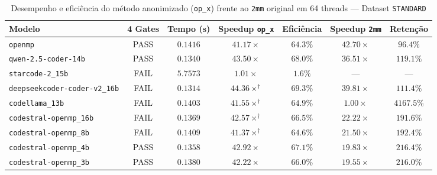 \begin{table}[htbp]
\centering
\caption{Desempenho e eficiência do método anonimizado (\texttt{op\_x}) frente ao \texttt{2mm} original em 64 threads — Dataset \texttt{STANDARD}}
\label{tab:anon_scale_standard_64t}
\small
\begin{tabular}{lcccccc}
\toprule
\textbf{Modelo} & \textbf{4 Gates} & \textbf{Tempo (s)} & \textbf{Speedup \texttt{op\_x}} & \textbf{Eficiência} & \textbf{Speedup \texttt{2mm}} & \textbf{Retenção} \\
\midrule
\texttt{openmp} & PASS & $0.1416$ & $41.17\times$ & $64.3\%$ & $42.70\times$ & $96.4\%$ \\
\texttt{qwen-2.5-coder-14b} & PASS & $0.1340$ & $43.50\times$ & $68.0\%$ & $36.51\times$ & $119.1\%$ \\
\texttt{starcode-2\_15b} & FAIL & $5.7573$ & $1.01\times$ & $1.6\%$ & --- & --- \\
\texttt{deepseekcoder-coder-v2\_16b} & FAIL & $0.1314$ & $44.36\times^\dagger$ & $69.3\%$ & $39.81\times$ & $111.4\%$ \\
\texttt{codellama\_13b} & FAIL & $0.1403$ & $41.55\times^\dagger$ & $64.9\%$ & $1.00\times$ & $4167.5\%$ \\
\texttt{codestral-openmp\_16b} & FAIL & $0.1369$ & $42.57\times^\dagger$ & $66.5\%$ & $22.22\times$ & $191.6\%$ \\
\texttt{codestral-openmp\_8b} & FAIL & $0.1409$ & $41.37\times^\dagger$ & $64.6\%$ & $21.50\times$ & $192.4\%$ \\
\texttt{codestral-openmp\_4b} & PASS & $0.1358$ & $42.92\times$ & $67.1\%$ & $19.83\times$ & $216.4\%$ \\
\texttt{codestral-openmp\_3b} & PASS & $0.1380$ & $42.22\times$ & $66.0\%$ & $19.55\times$ & $216.0\%$ \\
\bottomrule
\end{tabular}
\end{table}
